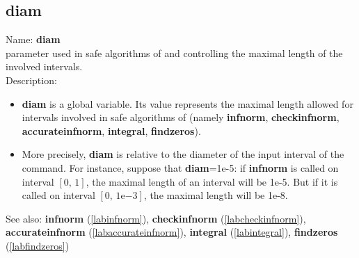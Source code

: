 \subsection{diam}
\label{labdiam}
\noindent Name: \textbf{diam}\\
parameter used in safe algorithms of \sollya and controlling the maximal length of the involved intervals.\\
\noindent Description: \begin{itemize}

\item \textbf{diam} is a global variable. Its value represents the maximal length allowed
   for intervals involved in safe algorithms of \sollya (namely \textbf{infnorm},
   \textbf{checkinfnorm}, \textbf{accurateinfnorm}, \textbf{integral}, \textbf{findzeros}).

\item More precisely, \textbf{diam} is relative to the diameter of the input interval of
   the command. For instance, suppose that \textbf{diam}=1e-5: if \textbf{infnorm} is called
   on interval $[0,\,1]$, the maximal length of an interval will be 1e-5. But if it
   is called on interval $[0,\,1\mathrm{e}{-3}]$, the maximal length will be 1e-8.
\end{itemize}
See also: \textbf{infnorm} (\ref{labinfnorm}), \textbf{checkinfnorm} (\ref{labcheckinfnorm}), \textbf{accurateinfnorm} (\ref{labaccurateinfnorm}), \textbf{integral} (\ref{labintegral}), \textbf{findzeros} (\ref{labfindzeros})
